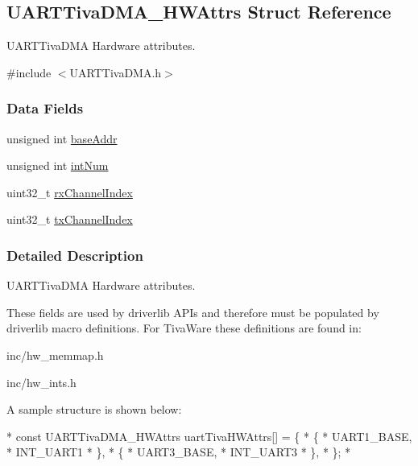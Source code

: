 \subsection{U\-A\-R\-T\-Tiva\-D\-M\-A\-\_\-\-H\-W\-Attrs Struct Reference}
\label{struct_u_a_r_t_tiva_d_m_a___h_w_attrs}


U\-A\-R\-T\-Tiva\-D\-M\-A Hardware attributes.  




{\ttfamily \#include $<$U\-A\-R\-T\-Tiva\-D\-M\-A.\-h$>$}

\subsubsection*{Data Fields}
\begin{DoxyCompactItemize}
\item 
unsigned int \hyperlink{struct_u_a_r_t_tiva_d_m_a___h_w_attrs_a0cee71a1b87b797dbf1e7660c1134611}{base\-Addr}
\item 
unsigned int \hyperlink{struct_u_a_r_t_tiva_d_m_a___h_w_attrs_af51acdaa385973204a6c5741e3e26f40}{int\-Num}
\item 
uint32\-\_\-t \hyperlink{struct_u_a_r_t_tiva_d_m_a___h_w_attrs_a0c35ca59f07ed055b768efb74d304db1}{rx\-Channel\-Index}
\item 
uint32\-\_\-t \hyperlink{struct_u_a_r_t_tiva_d_m_a___h_w_attrs_af4475ebe44ae2d17d0967c00266c586c}{tx\-Channel\-Index}
\end{DoxyCompactItemize}


\subsubsection{Detailed Description}
U\-A\-R\-T\-Tiva\-D\-M\-A Hardware attributes. 

These fields are used by driverlib A\-P\-Is and therefore must be populated by driverlib macro definitions. For Tiva\-Ware these definitions are found in\-:
\begin{DoxyItemize}
\item inc/hw\-\_\-memmap.\-h
\item inc/hw\-\_\-ints.\-h
\end{DoxyItemize}

A sample structure is shown below\-: 
\begin{DoxyCode}
*  \textcolor{keyword}{const} UARTTivaDMA_HWAttrs uartTivaHWAttrs[] = \{
*      \{
*          UART1\_BASE,
*          INT\_UART1
*      \},
*      \{
*          UART3\_BASE,
*          INT\_UART3
*      \},
*  \};
*  
\end{DoxyCode}
 

